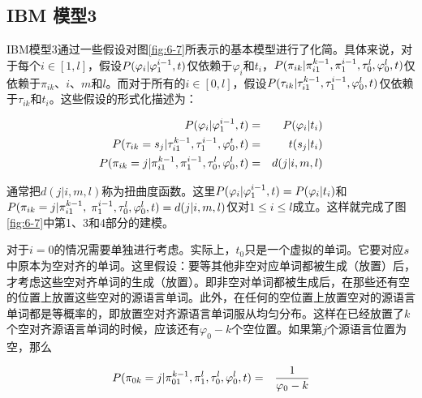 
\subsection{IBM 模型3}

\parinterval IBM模型3通过一些假设对图\ref{fig:6-7}所表示的基本模型进行了化简。具体来说，对于每个$i\in[1,l]$，假设${P}(\varphi_i |\varphi_1^{i-1},{t})$仅依赖于$\varphi_i$和$t_i$，${P}(\pi_{ik}|\pi_{i1}^{k-1},\pi_1^{i-1},\tau_0^l,\varphi_0^l,{t})$仅依赖于$\pi_{ik}$、$i$、$m$和$l$。而对于所有的$i\in[0,l]$，假设${P}(\tau_{ik}|\tau_{i1}^{k-1},\tau_1^{i-1},\varphi_0^l,{t})$仅依赖于$\tau_{ik}$和$t_i$。这些假设的形式化描述为：

\begin{eqnarray}
{P}(\varphi_i|\varphi_1^{i-1},{t})                                                              & = &{{P}(\varphi_i|t_i)} \label{eq:6-10} \\
{P}(\tau_{ik} = s_j |\tau_{i1}^{k-1},\tau_{1}^{i-1},\varphi_0^t,{t})             & = & t(s_j|t_i) \label{eq:6-11} \\
{P}(\pi_{ik} = j |\pi_{i1}^{k-1},\pi_{1}^{i-1},\tau_{0}^{l},\varphi_{0}^{l},{t}) & = & d(j|i,m,l) \label{eq:6-12}
\end{eqnarray}

\parinterval 通常把$d(j|i,m,l)$称为扭曲度函数。这里${P}(\varphi_i|\varphi_1^{i-1},{t})={{P}(\varphi_i|t_i)}$和${{P}(\pi_{ik}=j|\pi_{i1}^{k-1},}$ $\pi_{1}^{i-1},\tau_0^l,\varphi_0^l,{t})=d(j|i,m,l)$仅对$1 \le i \le l$成立。这样就完成了图\ref{fig:6-7}中第1、3和4部分的建模。

\parinterval 对于$i=0$的情况需要单独进行考虑。实际上，$t_0$只是一个虚拟的单词。它要对应${s}$中原本为空对齐的单词。这里假设：要等其他非空对应单词都被生成（放置）后，才考虑这些空对齐单词的生成（放置）。即非空对单词都被生成后，在那些还有空的位置上放置这些空对的源语言单词。此外，在任何的空位置上放置空对的源语言单词都是等概率的，即放置空对齐源语言单词服从均匀分布。这样在已经放置了$k$个空对齐源语言单词的时候，应该还有$\varphi_0-k$个空位置。如果第$j$个源语言位置为空，那么

\begin{eqnarray}
{P}(\pi_{0k}=j|\pi_{01}^{k-1},\pi_1^l,\tau_0^l,\varphi_0^l,{t}) & = & \frac{1}{\varphi_0-k}
\label{eq:6-13}
\end{eqnarray}

